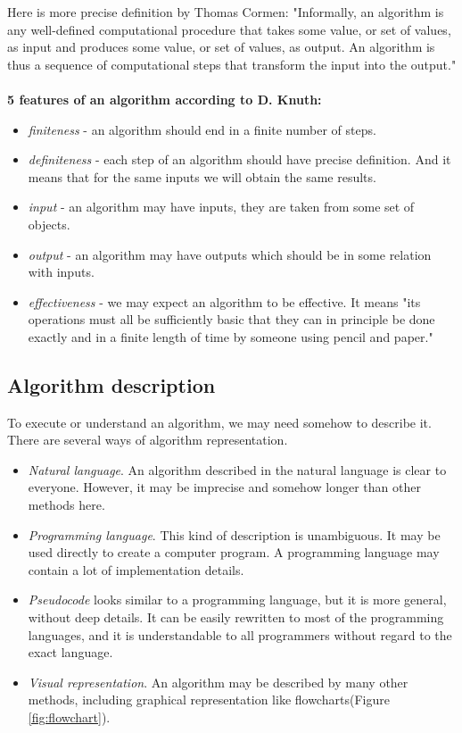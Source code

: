 \documentclass[
  field=inf,
  biblatex,
  language=english,
  glossaries,
  theorems=false,
  sourcecodes=false,
  index
]{kidiplom}
\begin{document}
Here is more precise definition by Thomas Cormen: "Informally, an algorithm is any well-defined computational procedure that takes some value, or set of values, as input and produces some value, or set of values, as output. An algorithm is thus a sequence of computational steps that transform the input into the output." \cite{cormen}
\\\\
\textbf{5 features of an algorithm according to D. Knuth\cite{knuth1}:}
\begin{itemize}
	\item \textit{finiteness} - an algorithm should end in a finite number of steps.
	\item \textit{definiteness} - each step of an algorithm should have precise definition. And it means that for the same inputs we will obtain the same results.
	\item \textit{input} - an algorithm may have inputs, they are taken from some set of objects.
	\item \textit{output} - an algorithm may have outputs which should be in some relation with inputs.
	\item \textit{effectiveness} - we may expect an algorithm to be effective. It means "its operations must all be sufficiently basic that they can in principle be done exactly and in a finite length of time by someone using pencil and paper."\cite{knuth1}
\end{itemize}

\subsection{Algorithm description}

To execute or understand an algorithm, we may need somehow to describe it. There are several ways of algorithm representation.

\begin{itemize}
	\item \textit{Natural language}. An algorithm described in the natural language is clear to everyone. However, it may be imprecise and somehow longer than other methods here.
	\item \textit{Programming language}. This kind of description is unambiguous. It may be used directly to create a computer program. A programming language may contain a lot of implementation details.
	\item \textit{Pseudocode} looks similar to a programming language, but it is more general, without deep details. It can be easily rewritten to most of the programming languages, and it is understandable to all programmers without regard to the exact language.
	\item \textit{Visual representation}. An algorithm may be described by many other methods, including graphical representation like flowcharts(Figure \ref{fig:flowchart}).
\end{itemize}
\end{document}
